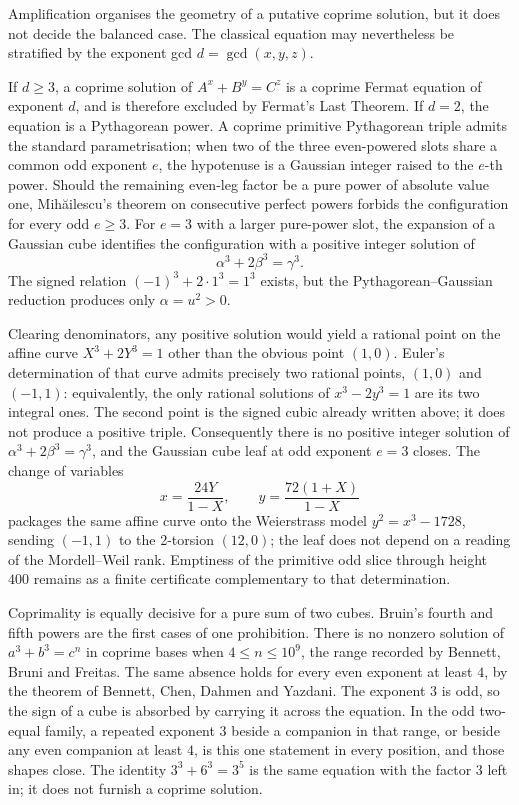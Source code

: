 \documentclass[a4paper]{article}
\theoremstyle{definition}
\theoremstyle{remark}
\begin{document}
Amplification organises the geometry of a putative coprime solution, but it does not decide the balanced case. The classical equation may nevertheless be stratified by the exponent gcd \( d=\gcd(x,y,z)\).

If \( d\ge 3 \), a coprime solution of \( A^x+B^y=C^z \) is a coprime Fermat equation of exponent \( d \), and is therefore excluded by Fermat's Last Theorem. If \( d=2 \), the equation is a Pythagorean power. A coprime primitive Pythagorean triple admits the standard parametrisation; when two of the three even-powered slots share a common odd exponent \( e \), the hypotenuse is a Gaussian integer raised to the \( e \)-th power. Should the remaining even-leg factor be a pure power of absolute value one, Mihăilescu's theorem on consecutive perfect powers forbids the configuration for every odd \( e\ge 3 \). For \( e=3 \) with a larger pure-power slot, the expansion of a Gaussian cube identifies the configuration with a positive integer solution of
\[
\alpha^3 + 2\beta^3 = \gamma^3.
\]
The signed relation \( (-1)^3 + 2\cdot 1^3 = 1^3 \) exists, but the Pythagorean--Gaussian reduction produces only \( \alpha = u^2 > 0 \).

Clearing denominators, any positive solution would yield a rational point on the affine curve \( X^3+2Y^3=1 \) other than the obvious point \( (1,0) \). Euler's determination of that curve admits precisely two rational points, \( (1,0) \) and \( (-1,1) \): equivalently, the only rational solutions of \( x^3-2y^3=1 \) are its two integral ones. The second point is the signed cubic already written above; it does not produce a positive triple. Consequently there is no positive integer solution of \( \alpha^3+2\beta^3=\gamma^3 \), and the Gaussian cube leaf at odd exponent \( e=3 \) closes. The change of variables
\[
x=\frac{24Y}{1-X},\qquad y=\frac{72(1+X)}{1-X}
\]
packages the same affine curve onto the Weierstrass model \( y^2=x^3-1728 \), sending \( (-1,1) \) to the 2-torsion \( (12,0) \); the leaf does not depend on a reading of the Mordell--Weil rank. Emptiness of the primitive odd slice through height \(400\) remains as a finite certificate complementary to that determination.

Coprimality is equally decisive for a pure sum of two cubes. Bruin's fourth and fifth powers are the first cases of one prohibition. There is no nonzero solution of \( a^3+b^3=c^n \) in coprime bases when \( 4\le n\le 10^9 \), the range recorded by Bennett, Bruni and Freitas. The same absence holds for every even exponent at least \( 4 \), by the theorem of Bennett, Chen, Dahmen and Yazdani. The exponent \( 3 \) is odd, so the sign of a cube is absorbed by carrying it across the equation. In the odd two-equal family, a repeated exponent \( 3 \) beside a companion in that range, or beside any even companion at least \( 4 \), is this one statement in every position, and those shapes close. The identity \( 3^3+6^3=3^5 \) is the same equation with the factor \( 3 \) left in; it does not furnish a coprime solution.
\end{document}
